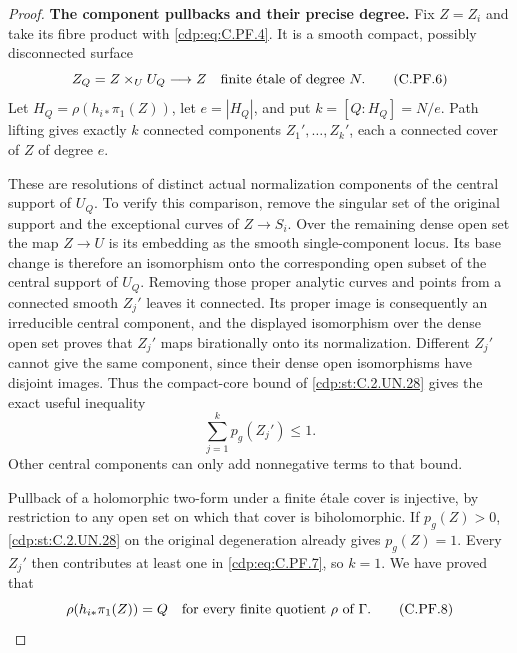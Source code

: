 \begin{proof}
\par\medskip\noindent\textbf{The component pullbacks and their precise degree.}
Fix $Z=Z_i$ and take its fibre product with \eqref{cdp:eq:C.PF.4}. It is a
smooth compact, possibly disconnected surface
\[
               Z_Q=Z\times_U U_Q\longrightarrow Z
                       \quad\hbox{finite \'{e}tale of degree }N .
                                                        \tag{C.PF.6}\label{cdp:eq:C.PF.6}
\]
Let $H_Q=\rho(h_{i*}\pi_1(Z))$, let $e=|H_Q|$, and put
$k=[Q:H_Q]=N/e$. Path lifting gives exactly $k$ connected
components $Z_1',\ldots,Z_k'$, each a connected cover of $Z$
of degree $e$.

These are resolutions of distinct actual normalization components
of the central support of $U_Q$. To verify this comparison, remove
the singular set of the original support and the exceptional
curves of $Z\to S_i$. Over the remaining dense open set the map
$Z\to U$ is its embedding as the smooth single-component locus.
Its base change is therefore an isomorphism onto the corresponding
open subset of the central support of $U_Q$. Removing those proper
analytic curves and points from a connected smooth $Z_j'$ leaves
it connected. Its proper image is consequently an irreducible
central component, and the displayed isomorphism over the dense
open set proves that $Z_j'$ maps birationally onto its normalization.
Different $Z_j'$ cannot give the same component, since their dense
open isomorphisms have disjoint images. Thus the compact-core
bound of \ref{cdp:st:C.2.UN.28} gives the exact useful inequality
\[
                         \sum_{j=1}^k p_g(Z_j')\le1 .
                                                        \tag{C.PF.7}\label{cdp:eq:C.PF.7}
\]
Other central components can only add nonnegative terms to that
bound.

Pullback of a holomorphic two-form under a finite \'{e}tale
cover is injective, by restriction to any open set on which
that cover is biholomorphic. If $p_g(Z)>0$, \ref{cdp:st:C.2.UN.28} on the
original degeneration already gives $p_g(Z)=1$. Every
$Z_j'$ then contributes at least one in \eqref{cdp:eq:C.PF.7}, so $k=1$.
We have proved that
\[
       \rho(h_{i*}\pi_1(Z))=Q
                 \quad\hbox{for every finite quotient }\rho
                         \hbox{ of }\Gamma .           \tag{C.PF.8}\label{cdp:eq:C.PF.8}
\]


\end{proof}
